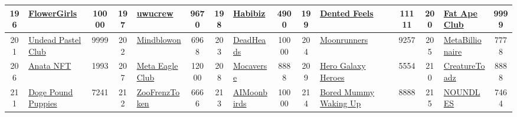 \begin{table*}[]
{\begin{tabular}{|c|l|c|c|l|c|c|l|c|c|l|c|c|l|c|}
        196   & \href{https://www.flowergirlsnft.com/}{FlowerGirls}                                & 10000             & 197   & \href{https://uwucrew.art}{uwucrew}                                                               & 9670              & 198   & \href{https://www.thehabibiz.io/}{Habibiz}                                        & 4900              & 199   & \href{https://www.dentedfeelsnft.com/}{Dented Feels}                          & 11111             & 200   & \href{https://fatapeclub.io/}{Fat Ape Club}                                               & 9999                                    \\ \hline
        201   & \href{https://undeadpastelclub.io/}{Undead Pastel Club}                            & 9999              & 202   & \href{http://mindblowon.io}{Mindblowon}                                                           & 6968              & 203   & \href{http://deadheads.io}{DeadHeads}                                             & 10000             & 204   & \href{http://moonrunners.io}{Moonrunners}                                     & 9257              & 205   & \href{http://metabillionaire.com}{MetaBillionaire}                                        & 7778                                    \\ \hline
        206   & \href{https://opensea.io/collection/the-anata-nft}{Anata NFT}                      & 1993              & 207   & \href{http://galyverse.io}{Meta Eagle Club}                                                       & 12000             & 208   & \href{https://mocaverse.xyz/}{Mocaverse}                                          & 8888              & 209   & \href{http://herogalaxy.io}{Hero Galaxy Heroes}                               & 5554              & 210   & \href{https://opensea.io/collection/creaturetoadz}{CreatureToadz}                         & 8888                                    \\ \hline
        211   & \href{https://thedogepoundnft.com/}{Doge Pound Puppies}                            & 7241              & 212   & \href{https://www.zoofrenz.com}{ZooFrenzToken}                                                    & 6666              & 213   & \href{https://nightbirds.art/}{AIMoonbirds}                                       & 10000             & 214   & \href{https://www.boredmummywakingup.com/}{Bored Mummy Waking Up}             & 8888              & 215   & \href{https://noundles.io/}{NOUNDLES}                                                     & 7464                                    \\ \hline

\end{tabular}}
\end{table*}
